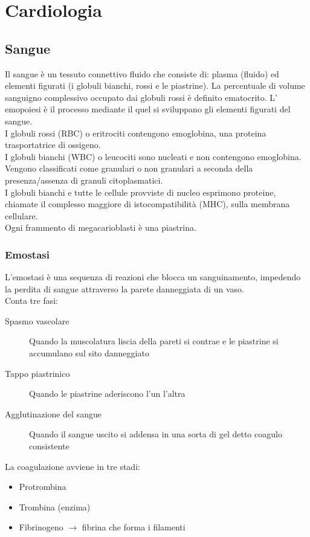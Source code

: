 \documentclass[a4paper]{article}
\begin{document}
\section{Cardiologia}
\subsection{Sangue}
Il sangue è un tessuto connettivo fluido che consiste di: plasma (fluido) ed
elementi figurati (i globuli bianchi, rossi e le piastrine). La percentuale di 
volume sanguigno complessivo occupato dai globuli rossi è definito ematocrito.
L’ emopoiesi è il processo mediante il quel si sviluppano gli elementi figurati 
del sangue. \\
I globuli rossi (RBC) o eritrociti contengono emoglobina, una proteina 
trasportatrice di ossigeno. \\
I globuli bianchi (WBC) o leucociti sono nucleati e non contengono emoglobina.
Vengono classificati come granulari o non granulari a seconda della 
presenza/assenza di granuli citoplasmatici. \\ 
I globuli bianchi e tutte le cellule provviste di nucleo esprimono proteine, 
chiamate il complesso maggiore di istocompatibilità (MHC), sulla membrana 
cellulare. \\
Ogni frammento di megacarioblasti è una piastrina.
\subsubsection{Emostasi}
L’emostasi è una sequenza di reazioni che blocca un sanguinamento, impedendo 
la perdita di sangue attraverso la parete danneggiata di un vaso. \\
Conta tre fasi:
\begin{description}
    \item[Spasmo vascolare] Quando la muscolatura liscia della pareti si 
    contrae e le piastrine si accumulano sul sito danneggiato
    \item[Tappo piastrinico] Quando le piastrine aderiscono l'un l'altra
    \item[Agglutinazione del sangue] Quando il sangue uscito si addensa in
    una sorta di gel detto coagulo consistente 
\end{description}

La coagulazione avviene in tre stadi:
\begin{itemize}
    \item Protrombina 
    \item Trombina (enzima)
    \item Fibrinogeno $\to$ fibrina che forma i filamenti
\end{itemize}
\end{document}
